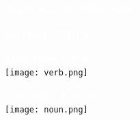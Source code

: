 \documentclass[12pt]{article}
\begin{document}
\begin{titlepage}
    \noindent
    \LARGE
    \fontsize{20}{20}\selectfont\textcolor{white}{\textbf{
            Top 5 Sentence Structures:\\\\
        }}
    \LARGE
    \fontsize{15}{15}\selectfont\textcolor{white}{\textbf{
            @STRUCTURES
        }}


    \vspace{0.8cm}
    \newpage
    \pagecolor{lb}
    \begin{center}
        \noindent
        \LARGE
        \fontsize{20}{20}\selectfont\textcolor{white}{\textbf{
                Most Used Verbs:\\
            }}
        \LARGE
        \vspace{0.5cm}
        \texttt{[image: verb.png]}
    \end{center}
    \begin{center}
        \noindent
        \LARGE
        \fontsize{20}{20}\selectfont\textcolor{white}{\textbf{
                Most Used Nouns:\\
            }}
        \LARGE
        \vspace{0.5cm}
        \texttt{[image: noun.png]}
    \end{center}

\end{titlepage}
\end{document}

